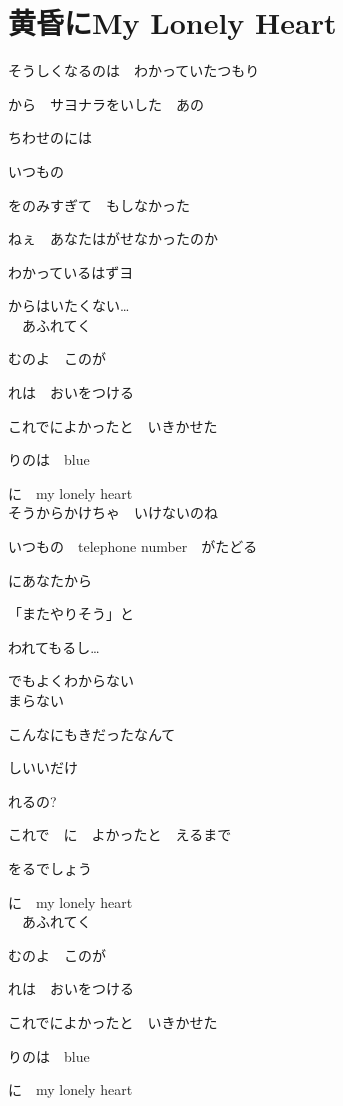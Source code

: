\section{ 黄昏にMy Lonely Heart}
\large{

そうしくなるのは　わかっていたつもり

から　サヨナラをいした　あの

ちわせのには

いつもの

をのみすぎて　もしなかった

ねぇ　あなたはがせなかったのか

わかっているはずヨ

からはいたくない…
\\

　あふれてく

むのよ　このが

れは　おいをつける

これでによかったと　いきかせた

りのは　blue

に　my lonely heart
\\

そうからかけちゃ　いけないのね

いつもの　telephone number　がたどる

にあなたから

「またやりそう」と

われてもるし…

でもよくわからない
\\

まらない

こんなにもきだったなんて

しいいだけ

れるの?

これで　に　よかったと　えるまで

をるでしょう

に　my lonely heart
\\

　あふれてく

むのよ　このが

れは　おいをつける

これでによかったと　いきかせた

りのは　blue

に　my lonely heart

}